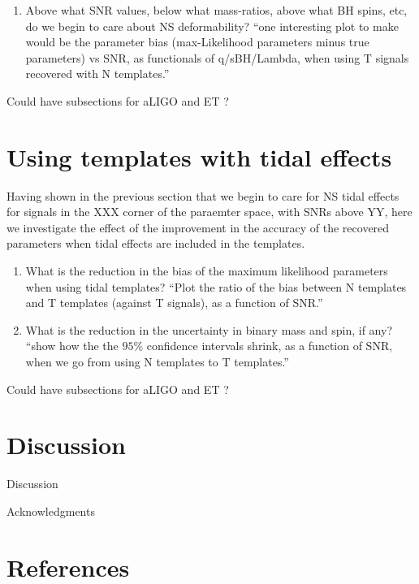 \documentclass[aps,prd,amsmath,floats,floatfix, twocolumn,
superscriptaddress,nofootinbib,showpacs]{revtex4-1}
\begin{document}
\begin{enumerate}
\item Above what SNR values, below what mass-ratios, above what BH spins, etc, 
do we begin to care about NS deformability?\newline
``one interesting plot to make would be the parameter bias (max-Likelihood
parameters minus true parameters) vs SNR, as functionals of q/sBH/Lambda, when
using T signals recovered with N templates.''
\end{enumerate}


Could have subsections for aLIGO and ET ?

\section{Using templates with tidal effects}
Having shown in the previous section that we begin to care for NS tidal effects
for signals in the XXX corner of the paraemter space, with SNRs above YY, here
we investigate the effect of the improvement in the accuracy of the recovered
parameters when tidal effects are included in the templates.

\begin{enumerate}
\item What is the reduction in the bias of the maximum likelihood parameters
when using tidal templates?\newline
``Plot the ratio of the bias between N templates and T templates (against T
signals), as a function of SNR.''
\item What is the reduction in the uncertainty in binary mass and spin, if
any?\newline
``show how the the $95\%$ confidence intervals shrink, as a function of SNR, 
when we go from using N templates to T templates.''
\end{enumerate}



Could have subsections for aLIGO and ET ?


\section{Discussion}
Discussion

\begin{acknowledgments}
Acknowledgments
\end{acknowledgments}

\section*{References}

\end{document}
